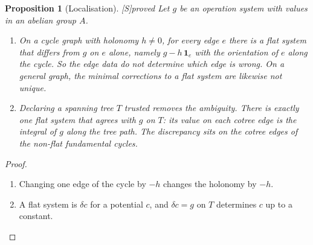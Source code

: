 \documentclass[11pt]{article}
\newtheorem{proposition}[theorem]{Proposition}
\theoremstyle{definition}
\theoremstyle{remark}
\newcommand{\src}[1]{\textsf{\small[#1]}}
\newcommand{\st}[1]{\textsf{\small\color{gray}#1}}
\begin{document}
\begin{proposition}[Localisation]\label{prop:local}\src{S}\st{proved}
Let $g$ be an operation system with values in an abelian group $A$.
\begin{enumerate}
  \item On a cycle graph with holonomy $h\neq0$, for \emph{every} edge $e$ there is a flat system that differs from $g$ on $e$ alone, namely $g-h\,\mathbf 1_e$ with the orientation of $e$ along the cycle. So the edge data do not determine which edge is wrong. On a general graph, the minimal corrections to a flat system are likewise not unique.
  \item Declaring a spanning tree $T$ trusted removes the ambiguity. There is exactly one flat system that agrees with $g$ on $T$: its value on each cotree edge is the integral of $g$ along the tree path. The discrepancy sits on the cotree edges of the non-flat fundamental cycles.
\end{enumerate}
\end{proposition}
\begin{proof}
\begin{enumerate}
  \item Changing one edge of the cycle by $-h$ changes the holonomy by $-h$.
  \item A flat system is $\delta c$ for a potential $c$, and $\delta c=g$ on $T$ determines $c$ up to a constant.
\end{enumerate}
\end{proof}
\end{document}
